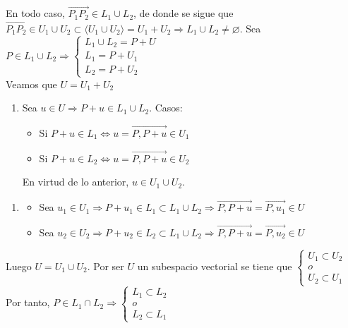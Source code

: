 \documentclass[12pt, a4paper, ones, notitlepage, openany,titlepage]{article}
\begin{document}
En todo caso, $\overrightarrow{P_{1} P_{2}} \in L_{1} \cup L_{2}$, de donde se sigue que $\overrightarrow{P_1 P_2} \in U_1 \cup U_2 \subset \langle U_1 \cup U_2 \rangle = U_1 + U_2 \Longrightarrow L_1 \cup L_2 \neq \varnothing$. Sea $P \in L_1 \cup L_2 \Longrightarrow \begin{cases}
	L_1 \cup L_2 = P + U \\
	L_1 = P + U_1 \\
	L_2 = P + U_2
\end{cases}$ \\
Veamos que $U = U_1 + U_2$
\begin{enumerate}[label=$\subset/$]
	\item Sea $u \in U \Longrightarrow P + u \in L_1 \cup L_2$. Casos:
	\begin{itemize}
		\item Si $P + u \in L_1 \Longleftrightarrow u = \overrightarrow{P,P+u} \in U_1$
		\item Si $P + u \in L_2 \Longleftrightarrow u = \overrightarrow{P,P+u} \in U_2$
	\end{itemize}
	En virtud de lo anterior, $u \in U_1 \cup U_2$.
\end{enumerate}
\begin{enumerate}[label=$\supset/$]
	\item \begin{itemize}
	\item Sea $u_1 \in U_1 \Longrightarrow P + u_1 \in L_1 \subset L_1 \cup L_2 \Longrightarrow \overrightarrow{P,P+u} = \overrightarrow{P,u_1} \in U$
	\item Sea $u_2 \in U_2 \Longrightarrow P + u_2 \in L_2 \subset L_1 \cup L_2 \Longrightarrow \overrightarrow{P,P+u} = \overrightarrow{P,u_2} \in U$
	\end{itemize}
\end{enumerate}
Luego $U = U_1 \cup U_2$. Por ser $U$ un subespacio vectorial se tiene que $\begin{cases}
	U_1 \subset U_2 \\
	o \\
	U_2 \subset U_1
\end{cases}$ \\
Por tanto, $P \in L_1 \cap L_2 \Longrightarrow \begin{cases}
	L_1 \subset L_2 \\
	o \\
	L_2 \subset L_1
\end{cases}$
\end{document}
